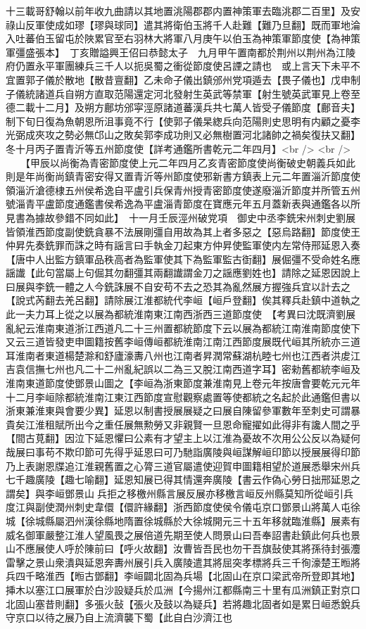 十三載哥舒翰以前年收九曲請以其地置洮陽郡郡内置神策軍去臨洮郡二百里】及安祿山反軍使成如璆【璆與球同】遣其將衛伯玉將千人赴難【難乃旦翻】既而軍地淪入吐蕃伯玉留屯於陜累官至右羽林大將軍八月庚午以伯玉為神策軍節度使【為神策軍彊盛張本】　丁亥贈謚興王佋曰恭懿太子　九月甲午置南都於荆州以荆州為江陵府仍置永平軍團練兵三千人以扼吳蜀之衝從節度使呂諲之請也　或上言天下未平不宜置郭子儀於散地【散昔亶翻】乙未命子儀出鎮邠州党項遁去【畏子儀也】戊申制子儀統諸道兵自朔方直取范陽還定河北發射生英武等禁軍【射生號英武軍見上卷至德二載十二月】及朔方鄜坊邠寜涇原諸道蕃漢兵共七萬人皆受子儀節度【鄜音夫】制下旬日復為魚朝恩所沮事竟不行【使郭子儀杲緫兵向范陽則史思明有内顧之憂李光弼成夾攻之勢必無邙山之敗矣郭李成功則又必無樹置河北諸帥之禍矣復扶又翻】冬十月丙子置青沂等五州節度使【詳考通鑑所書乾元二年四月】<br />
<br />
　　【甲辰以尚衡為青密節度使上元二年四月乙亥青密節度使尚衡破史朝義兵如此則是年尚衡尚鎮青密安得又置青沂等州節度使邪新書方鎮表上元二年置淄沂節度使領淄沂滄德棣五州侯希逸自平盧引兵保青州授青密節度使遂廢淄沂節度并所管五州號淄青平盧節度通鑑書侯希逸為平盧淄青節度在寶應元年五月蓋新表與通鑑各以所見書為據故參錯不同如此】　十一月壬辰涇州破党項　御史中丞李銑宋州刺史劉展皆領淮西節度副使銑貪暴不法展剛彊自用故為其上者多惡之【惡烏路翻】節度使王仲昇先奏銑罪而誅之時有謡言曰手執金刀起東方仲昇使監軍使内左常侍邢延恩入奏【唐中人出監方鎮軍品秩高者為監軍使其下為監軍監古衘翻】展倔彊不受命姓名應謡䜟【此句當屬上句倔其勿翻彊其兩翻䜟謂金刀之謡應劉姓也】請除之延恩因說上曰展與李銑一體之人今銑誅展不自安苟不去之恐其為亂然展方握強兵宜以計去之【說式芮翻去羌呂翻】請除展江淮都統代李峘【峘戶登翻】俟其釋兵赴鎮中道執之此一夫力耳上從之以展為都統淮南東江南西浙西三道節度使　【考異曰沈既濟劉展亂紀云淮南東道浙江西道凡二十三州置都統節度下云以展為都統江南淮南節度使下又云三道皆發吏申圖籍按舊李峘傳峘都統淮南江南江西節度展既代峘其所統亦三道耳淮南者東道楊楚滁和舒廬濠夀八州也江南者昇潤常蘇湖杭睦七州也江西者洪䖍江吉袁信撫七州也凡二十二州亂紀誤以二為三又脫江南西道字耳】密勑舊都統李峘及淮南東道節度使鄧景山圖之【李峘為浙東節度兼淮南見上卷元年按唐會要乾元元年十二月李峘除都統淮南江東江西節度宣慰觀察處置等使都統之名起於此通鑑但書以浙東兼淮東與會要少異】延恩以制書授展展疑之曰展自陳留參軍數年至刺史可謂暴貴矣江淮租賦所出今之重任展無勲勞又非親賢一旦恩命寵擢如此得非有讒人間之乎【間古莧翻】因泣下延恩懼曰公素有才望主上以江淮為憂故不次用公公反以為疑何哉展曰事苟不欺印節可先得乎延恩曰可乃馳詣廣陵與峘謀解峘印節以授展展得印節乃上表謝恩牒追江淮親舊置之心膂三道官屬遣使迎賀申圖籍相望於道展悉舉宋州兵七千趣廣陵【趣七喻翻】延恩知展已得其情還奔廣陵【書云作偽心勞日拙邢延恩之謂矣】與李峘鄧景山兵拒之移檄州縣言展反展亦移檄言峘反州縣莫知所從峘引兵度江與副使潤州刺史韋儇【儇許緣翻】浙西節度使侯令儀屯京口鄧景山將萬人屯徐城【徐城縣屬泗州漢徐縣地隋置徐城縣於大徐城開元三十五年移就臨淮縣】展素有威名御軍嚴整江淮人望風畏之展倍道先期至使人問景山曰吾奉詔書赴鎮此何兵也景山不應展使人呼於陳前曰【呼火故翻】汝曹皆吾民也勿干吾旗鼔使其將孫待封張灋雷擊之景山衆潰與延恩奔夀州展引兵入廣陵遣其將屈突孝標將兵三千徇濠楚王暅將兵四千略淮西【暅古鄧翻】李峘闢北固為兵場【北固山在京口梁武帝所登即其地】挿木以塞江口展軍於白沙設疑兵於瓜洲【今揚州江都縣南三十里有瓜洲鎮正對京口北固山塞昔則翻】多張火鼔【張火及鼓以為疑兵】若將趣北固者如是累日峘悉銳兵守京口以待之展乃自上流濟襲下蜀【此自白沙濟江也
